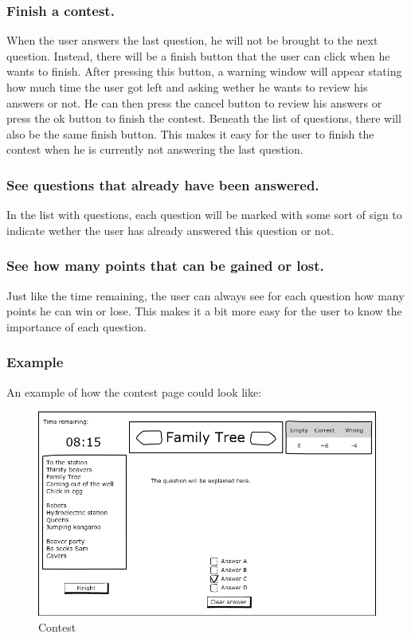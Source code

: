 \subsubsection*{Finish a contest.} 
When the user answers the last question, he will not be brought to the next question. Instead, there will be a finish button that the user can click when he wants to finish. After pressing this button, a warning window will appear stating how much time the user got left and asking wether he wants to review his answers or not. He can then press the cancel button to review his answers or press the ok button to finish the contest. Beneath the list of questions, there will also be the same finish button. This makes it easy for the user to finish the contest when he is currently not answering the last question. 

\subsubsection*{See questions that already have been answered.} 
In the list with questions, each question will be marked with some sort of sign to indicate wether the user has already answered this question or not. 

\subsubsection*{See how many points that can be gained or lost.}
Just like the time remaining, the user can always see for each question how many points he can win or lose. This makes it a bit more easy for the user to know the importance of each question. 

\subsubsection*{Example}
An example of how the contest page could look like: 
		\begin{figure}[h]
		  \centering
			\includegraphics[width=1\textwidth]{img/contests.png}
		  \caption{Contest}
		  \label{Contest}
		\end{figure}

